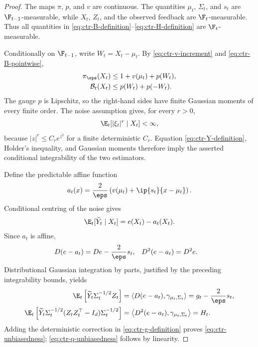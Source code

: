 \begin{proof}
    The maps $\pi$, $p$, and $v$ are continuous.  The quantities
    $\mu_t$, $\Sigma_t$, and $s_t$ are $\F_{t-1}$-measurable, while
    $X_t$, $Z_t$, and the observed feedback are $\F_t$-measurable.  Thus all
    quantities in \eqref{eq:ctr-B-definition}--\eqref{eq:ctr-H-definition}
    are $\F_t$-measurable.

    Conditionally on $\F_{t-1}$, write $W_t=X_t-\mu_t$.  By
    \eqref{eq:ctr-v-increment} and \eqref{eq:ctr-B-pointwise},
    \begin{align}
        \pi_\eps(X_t)     & \leq1+v(\mu_t)+p(W_t),
        \\
        \mathcal B_t(X_t) & \leq p(W_t)+p(-W_t).
        \label{eq:ctr-integrability-envelope}
    \end{align}
    The gauge $p$ is Lipschitz, so the right-hand sides have finite Gaussian
    moments of every finite order.  The noise assumption gives, for every
    $r>0$,
    \begin{align}
        \E_t[|\xi_t|^r\mid X_t]<\infty,
    \end{align}
    because $|z|^r\leq C_r e^{z^2}$ for a finite deterministic $C_r$.
    Equation \eqref{eq:ctr-Y-definition}, Holder's inequality, and Gaussian
    moments therefore imply the asserted conditional integrability of the
    two estimators.

    Define the predictable affine function
    \begin{align}
        a_t(x)=\frac2\eps
        \left(v(\mu_t)+\ip{s_t}{x-\mu_t}\right).
    \end{align}
    Conditional centring of the noise gives
    \begin{align}
        \E_t[\widetilde Y_t\mid X_t]=e(X_t)-a_t(X_t).
        \label{eq:ctr-Y-conditional-mean}
    \end{align}
    Since $a_t$ is affine,
    \begin{align}
        D(e-a_t)   & =De-\frac2\eps s_t,
                   &
        D^2(e-a_t) & =D^2e.
    \end{align}
    Distributional Gaussian integration by parts, justified by the preceding
    integrability bounds, yields
    \begin{align}
        \E_t\left[
            \widetilde Y_t\Sigma_t^{-1/2}Z_t
            \right]
         & =\left\langle D(e-a_t),\gamma_{\mu_t,\Sigma_t}\right\rangle
        =g_t-\frac2\eps s_t,
        \\
        \E_t\left[
            \widetilde Y_t\Sigma_t^{-1/2}
            (Z_tZ_t^\top-I_d)\Sigma_t^{-1/2}
            \right]
         & =\left\langle D^2(e-a_t),\gamma_{\mu_t,\Sigma_t}\right\rangle
        =H_t.
    \end{align}
    Adding the deterministic correction in
    \eqref{eq:ctr-g-definition} proves \eqref{eq:ctr-unbiasedness};
    \eqref{eq:ctr-q-unbiasedness} follows by linearity.
\end{proof}

